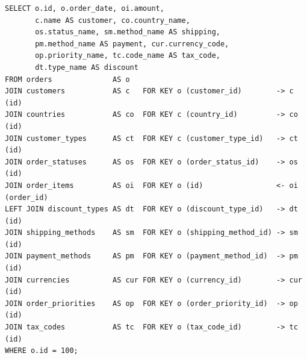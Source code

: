 \documentclass[12pt]{article}
\newcommand{\FanoutCheckHeight}[3]{%
  \ifdim\dimexpr\ht#1+\dp#1\relax>#2\relax
    \PackageError{fanout-layout}{#3 exceeds its vertical allocation}%
      {Adjust the terminal line spacing or the box position.}%
  \fi
}
\begin{document}
\newsavebox{\canonicalStageEight}
\begin{lrbox}{\canonicalStageEight}\begin{minipage}{344mm}
\begin{NoHyper}
\begin{lstlisting}[style=complex-sql]
SELECT o.id, o.order_date, oi.amount,
       c.name AS customer, co.country_name,
       os.status_name, sm.method_name AS shipping,
       pm.method_name AS payment, cur.currency_code,
       op.priority_name, tc.code_name AS tax_code,
       dt.type_name AS discount
FROM orders              AS o
JOIN customers           AS c   FOR KEY o (customer_id)        -> c (id)
JOIN countries           AS co  FOR KEY c (country_id)         -> co (id)
JOIN customer_types      AS ct  FOR KEY c (customer_type_id)   -> ct (id)
JOIN order_statuses      AS os  FOR KEY o (order_status_id)    -> os (id)
JOIN order_items         AS oi  FOR KEY o (id)                 <- oi (order_id)
LEFT JOIN discount_types AS dt  FOR KEY o (discount_type_id)   -> dt (id)
JOIN shipping_methods    AS sm  FOR KEY o (shipping_method_id) -> sm (id)
JOIN payment_methods     AS pm  FOR KEY o (payment_method_id)  -> pm (id)
JOIN currencies          AS cur FOR KEY o (currency_id)        -> cur (id)
JOIN order_priorities    AS op  FOR KEY o (order_priority_id)  -> op (id)
JOIN tax_codes           AS tc  FOR KEY o (tax_code_id)        -> tc (id)
WHERE o.id = 100;
\end{lstlisting}
\end{NoHyper}
\end{minipage}\end{lrbox}
\FanoutCheckHeight{\canonicalStageEight}{122mm}{Canonical-form state 8}
\end{document}
